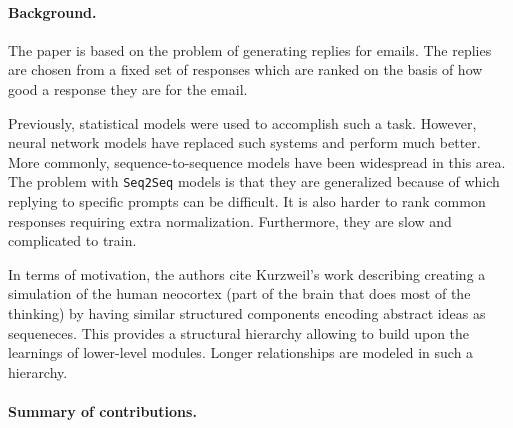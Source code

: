 \documentclass{article}
\begin{document}

\paragraph{Background.}
The paper is based on the problem of generating replies for emails. The replies are chosen from a fixed set of responses which are ranked on the basis of how good a response they are for the email.

Previously, statistical models were used to accomplish such a task. However, neural network models have replaced such systems and perform much better. More commonly, sequence-to-sequence models have been widespread in this area. The problem with \texttt{Seq2Seq} models is that they are generalized because of which replying to specific prompts can be difficult. It is also harder to rank common responses requiring extra normalization. Furthermore, they are slow and complicated to train.

In terms of motivation, the authors cite Kurzweil's work describing creating a simulation of the human neocortex (part of the brain that does most of the thinking) by having similar structured components encoding abstract ideas as sequeneces. This provides a structural hierarchy allowing to build upon the learnings of lower-level modules. Longer relationships are modeled in such a hierarchy.

\paragraph{Summary of contributions.}
\end{document}
